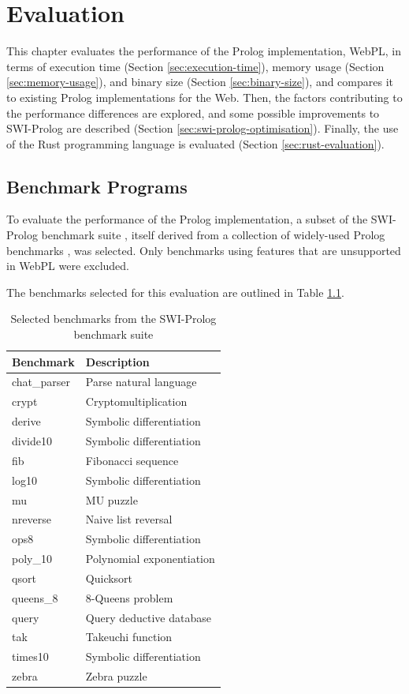 \chapter{Evaluation}

This chapter evaluates the performance of the Prolog implementation, WebPL, in terms of execution time (Section \ref{sec:execution-time}), memory usage (Section \ref{sec:memory-usage}), and binary size (Section \ref{sec:binary-size}), and compares it to existing Prolog implementations for the Web. Then, the factors contributing to the performance differences are explored, and some possible improvements to SWI-Prolog are described (Section \ref{sec:swi-prolog-optimisation}). Finally, the use of the Rust programming language is evaluated (Section \ref{sec:rust-evaluation}).

\section{Benchmark Programs}

To evaluate the performance of the Prolog implementation, a subset of the SWI-Prolog benchmark suite \cite{wielemakerSWIPrologbenchmarksuite2010}, itself derived from a collection of widely-used Prolog benchmarks \cite{haygoodPrologBenchmarkSuite1989}, was selected. Only benchmarks using features that are unsupported in WebPL were excluded.

The benchmarks selected for this evaluation are outlined in Table \ref{tab:benchmarks}.

\begin{table}[H]
\centering
\begin{tabular}{ll}
\hline
\textbf{Benchmark} & \textbf{Description} \\
\hline
chat\_parser & Parse natural language \\
crypt & Cryptomultiplication \\
derive & Symbolic differentiation \\
divide10 & Symbolic differentiation \\
fib & Fibonacci sequence \\
log10 & Symbolic differentiation \\
mu & MU puzzle \\
nreverse & Naive list reversal \\
ops8 & Symbolic differentiation \\
poly\_10 & Polynomial exponentiation \\
qsort & Quicksort \\
queens\_8 & 8-Queens problem \\
query & Query deductive database \\
tak & Takeuchi function \\
times10 & Symbolic differentiation \\
zebra & Zebra puzzle \\
\hline
\end{tabular}
\caption{Selected benchmarks from the SWI-Prolog benchmark suite}
\label{tab:benchmarks}
\end{table}

